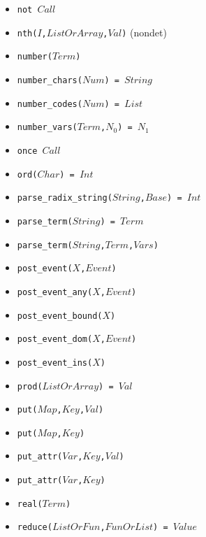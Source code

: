 \documentclass[10pt]{article}
\begin{document}
\begin{multicols}{2}
\begin{scriptsize}
\begin{itemize}
    \item \texttt{not $Call$}
    \item \texttt{nth($I$,$ListOrArray$,$Val$)} (nondet)
    \item \texttt{number($Term$)} 
    \item \texttt{number\_chars($Num$) = $String$} 
    \item \texttt{number\_codes($Num$) = $List$} 
    \item \texttt{number\_vars($Term$,$N_0$) = $N_1$}
    \item \texttt{once $Call$}
    \item \texttt{ord($Char$) = $Int$} 
    \item \texttt{parse\_radix\_string($String$,$Base$) = $Int$}
    \item \texttt{parse\_term($String$) = $Term$}
    \item \texttt{parse\_term($String$,$Term$,$Vars$)}
    \item \texttt{post\_event($X$,$Event$)}
    \item \texttt{post\_event\_any($X$,$Event$)}
    \item \texttt{post\_event\_bound($X$)}
    \item \texttt{post\_event\_dom($X$,$Event$)}
    \item \texttt{post\_event\_ins($X$)}
    \item \texttt{prod($ListOrArray$) = $Val$}
    \item \texttt{put($Map$,$Key$,$Val$)} 
    \item \texttt{put($Map$,$Key$)} 
    \item \texttt{put\_attr($Var$,$Key$,$Val$)} 
    \item \texttt{put\_attr($Var$,$Key$)} 
    \item \texttt{real($Term$)} 
    \item \texttt{reduce($ListOrFun$,$FunOrList$) = $Value$} 

\end{itemize}
\end{scriptsize}
\end{multicols}
\end{document}
